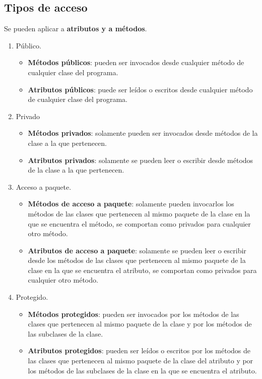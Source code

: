 \documentclass{article}
\begin{document}
\newpage

\subsection{Tipos de acceso} 
Se pueden aplicar a \textbf{atributos y a métodos}.
\begin{enumerate}
    \item Público.
    \begin{itemize}
        \item \textbf{Métodos públicos}: pueden ser invocados desde cualquier método de cualquier clase del programa.
        \item \textbf{Atributos públicos}: puede ser leídos o escritos desde cualquier método de cualquier clase del programa.
    \end{itemize}

    \item Privado
    \begin{itemize}
        \item \textbf{Métodos privados}: solamente pueden ser invocados desde métodos de la clase a la que pertenecen.
        \item \textbf{Atributos privados}: solamente se pueden leer o escribir desde métodos de la clase a la que pertenecen.
    \end{itemize}

    \item Acceso a paquete.
    \begin{itemize}
        \item \textbf{Métodos de acceso a paquete}: solamente pueden invocarlos los métodos de las clases que pertenecen al mismo paquete de la clase en la que se encuentra el método, se comportan como privados para cualquier otro método.

        \item \textbf{Atributos de acceso a paquete}: solamente se pueden leer o escribir desde los métodos de las clases que pertenecen al mismo paquete de la clase en la que se encuentra el atributo, se comportan como privados para cualquier otro método. 
    \end{itemize}

    \item Protegido.
    \begin{itemize}
        \item \textbf{Métodos protegidos}: pueden ser invocados por los métodos de las clases que pertenecen al mismo paquete de la clase y por los métodos de las subclases de la clase.

        \item \textbf{Atributos protegidos}: pueden ser leídos o escritos por los métodos de las  clases que pertenecen al mismo paquete de la clase del atributo y por los métodos de las subclases de la clase en la que se encuentra el atributo. 
    \end{itemize}
\end{enumerate}
\end{document}

